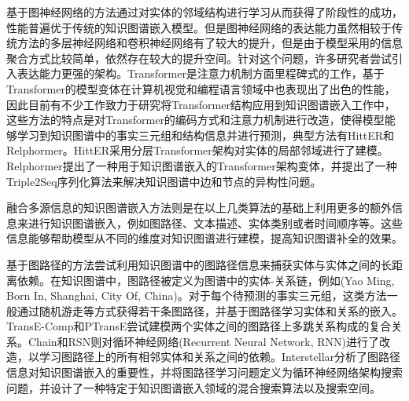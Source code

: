 基于图神经网络的方法通过对实体的邻域结构进行学习从而获得了阶段性的成功，性能普遍优于传统的知识图谱嵌入模型。但是图神经网络的表达能力虽然相较于传统方法的多层神经网络和卷积神经网络有了较大的提升，但是由于模型采用的信息聚合方式比较简单，依然存在较大的提升空间。针对这个问题，许多研究者尝试引入表达能力更强的架构。Transformer是注意力机制方面里程碑式的工作，基于Transformer的模型变体在计算机视觉和编程语言领域中也表现出了出色的性能，因此目前有不少工作致力于研究将Transformer结构应用到知识图谱嵌入工作中，这些方法的特点是对Transformer的编码方式和注意力机制进行改造，使得模型能够学习到知识图谱中的事实三元组和结构信息并进行预测，典型方法有HittER和Relphormer。HittER采用分层Transformer架构对实体的局部邻域进行了建模。Relphormer提出了一种用于知识图谱嵌入的Transformer架构变体，并提出了一种Triple2Seq序列化算法来解决知识图谱中边和节点的异构性问题。

融合多源信息的知识图谱嵌入方法则是在以上几类算法的基础上利用更多的额外信息来进行知识图谱嵌入，例如图路径、文本描述、实体类别或者时间顺序等。这些信息能够帮助模型从不同的维度对知识图谱进行建模，提高知识图谱补全的效果。

基于图路径的方法尝试利用知识图谱中的图路径信息来捕获实体与实体之间的长距离依赖。在知识图谱中，图路径被定义为图谱中的实体-关系链，例如(Yao Ming, Born In, Shanghai, City Of, China)。对于每个待预测的事实三元组，这类方法一般通过随机游走等方式获得若干条图路径，并基于图路径学习实体和关系的嵌入。TransE-Comp和PTransE尝试建模两个实体之间的图路径上多跳关系构成的复合关系。Chain和RSN则对循环神经网络(Recurrent Neural Network, RNN)进行了改造，以学习图路径上的所有相邻实体和关系之间的依赖。Interstellar分析了图路径信息对知识图谱嵌入的重要性，并将图路径学习问题定义为循环神经网络架构搜索问题，并设计了一种特定于知识图谱嵌入领域的混合搜索算法以及搜索空间。

